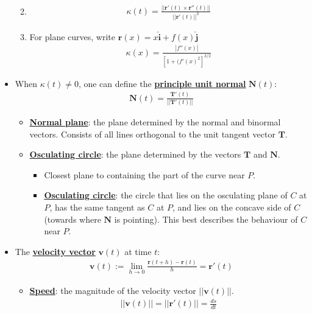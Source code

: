 \documentclass[reqno,11pt]{amsart}
\theoremstyle{definition}
\theoremstyle{remark}
\newcommand{\dfn}[1]{\underline{\textbf{#1}}}
\begin{document}
\begin{itemize}[noitemsep]
\begin{enumerate}[noitemsep]
\begin{align}
		\end{align}
		\item 
		\begin{align}
			\kappa (t) = \frac{|| \mathbf{r}'(t) \times \mathbf{r}''(t) ||}{|| \mathbf{r}'(t) ||^3}
		\end{align}
		\item For plane curves, write $\mathbf{r}(x) = x \mathbf{\hat{i}} + f(x) \mathbf{\hat{j}}$ 
		\begin{align}
				\kappa (x) = \frac{|f''(x)|}{[1+ (f'(x)^2]^{3/2} }
		\end{align}
	\end{enumerate}
	\item When $\kappa(t) \neq 0$, one can define the \dfn{principle unit normal} $\mathbf{N}(t)$: 
	\begin{align}
		\mathbf{N}(t) = \frac{\mathbf{T}'(t)}{|| \mathbf{T}'(t) ||}	
	\end{align}
	\begin{itemize}
		\item \dfn{Normal plane}: the plane determined by the normal and binormal vectors. Consists of all lines orthogonal to the unit tangent vector $\mathbf{T}$. 
		\item \dfn{Osculating circle}: the plane determined by the vectors $\mathbf{T}$ and $\mathbf{N}$. 
		\begin{itemize}
			\item Closest plane to containing the part of the curve near $P$. 
			\item \dfn{Osculating circle}: the circle that lies on the osculating plane of $C$ at $P$, has the same tangent as $C$ at $P$, and lies on the concave side of $C$ (towards where $\mathbf{N}$ is pointing). This best describes the behaviour of $C$ near $P$. 
		\end{itemize}
	\end{itemize}
	\item The \dfn{velocity vector} $\mathbf{v}(t)$ at time $t$: 
	\begin{align}
		\mathbf{v}(t) := \lim_{h \rightarrow 0} \frac{\mathbf{r}(t+h) - \mathbf{r}(t)}{h} = \mathbf{r}'(t) 	
	\end{align}
	\begin{itemize}
		\item \dfn{Speed}: the magnitude of the velocity vector $|| \mathbf{v}(t) ||$. 
		\begin{align}
			|| \mathbf{v}(t) || = || \mathbf{r}'(t) || = \frac{ds}{dt}	
		\end{align}

\end{itemize}
\end{itemize}
\end{document}
